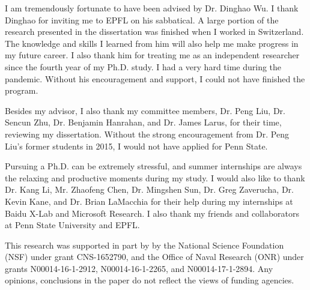I am tremendously fortunate to have been advised by Dr. Dinghao Wu.  I thank Dinghao for inviting me to EPFL on his sabbatical. A large portion of the research presented in the dissertation was finished when I worked in Switzerland. The knowledge and skills I learned from him will also help me make progress in my future career. I also thank him for treating me as an independent researcher since the fourth year of my Ph.D. study. I had a very hard time during the pandemic. Without his encouragement and support, I could not have finished the program.

Besides my advisor, I also thank my committee members, Dr. Peng Liu, Dr. Sencun Zhu, Dr. Benjamin Hanrahan, and Dr. James Larus, for their time, reviewing my dissertation. Without the strong encouragement from Dr. Peng Liu's former students in 2015, I would not have applied for Penn State.

Pursuing a Ph.D. can be extremely stressful, and summer internships are always the relaxing and productive moments during my study. I would also like to thank Dr. Kang Li, Mr. Zhaofeng Chen, Dr. Mingshen Sun, Dr. Greg Zaverucha, Dr. Kevin Kane, and Dr. Brian LaMacchia for their help during my internships at Baidu X-Lab and Microsoft Research.  I also thank my friends and collaborators at Penn State University and EPFL. 

This research was supported in part by by the National Science Foundation (NSF) under grant CNS-1652790, and the Office of Naval Research (ONR) under grants N00014-16-1-2912, N00014-16-1-2265, and N00014-17-1-2894. Any opinions, conclusions in the paper do not reflect the views of funding agencies.


